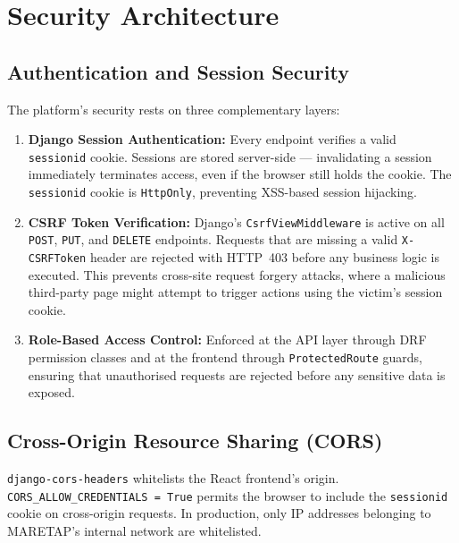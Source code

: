 \section{Security Architecture}
\begin{sloppypar}

\subsection{Authentication and Session Security}

The platform's security rests on three complementary layers:

\begin{enumerate}
  \item \textbf{Django Session Authentication:} Every endpoint verifies a valid
    \texttt{sessionid} cookie. Sessions are stored server-side --- invalidating
    a session immediately terminates access, even if the browser still holds
    the cookie. The \texttt{sessionid} cookie is \texttt{HttpOnly}, preventing
    XSS-based session hijacking.

  \item \textbf{CSRF Token Verification:} Django's \texttt{CsrfViewMiddleware}
    is active on all \texttt{POST}, \texttt{PUT}, and \texttt{DELETE}
    endpoints. Requests that are missing a valid \texttt{X-CSRFToken} header
    are rejected with HTTP~403 before any business logic is executed. This
    prevents cross-site request forgery attacks, where a malicious third-party
    page might attempt to trigger actions using the victim's session cookie.

  \item \textbf{Role-Based Access Control:} Enforced at the API layer through
    DRF permission classes and at the frontend through \texttt{ProtectedRoute}
    guards, ensuring that unauthorised requests are rejected before any
    sensitive data is exposed.
\end{enumerate}

\subsection{Cross-Origin Resource Sharing (CORS)}

\texttt{django-cors-headers} whitelists the React frontend's origin.
\texttt{CORS\_ALLOW\_CREDENTIALS = True} permits the browser to include the
\texttt{sessionid} cookie on cross-origin requests. In production, only
IP addresses belonging to MARETAP's internal network are whitelisted.


\end{sloppypar}
